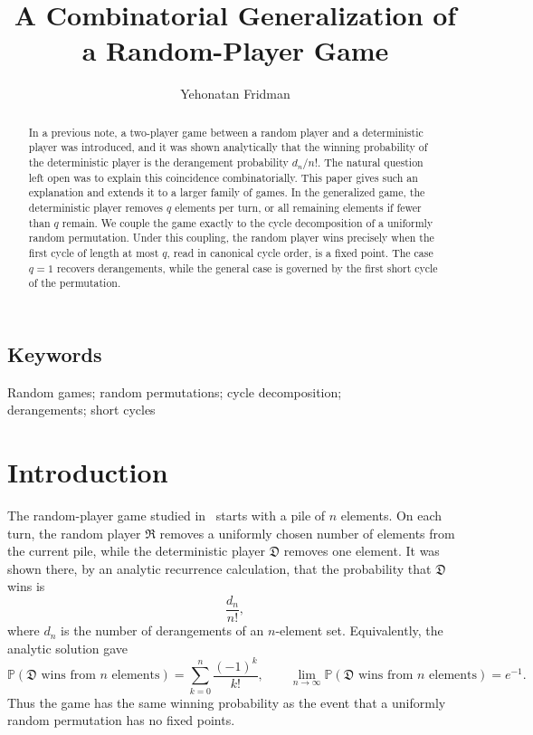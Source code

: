 \documentclass{article}
\title{A Combinatorial Generalization of a Random-Player Game}
\author{Yehonatan Fridman}
\affil{Ben-Gurion University, NRCN, Israel \thanks{fridyeh@post.bgu.ac.il}}
\date{}
\newcommand{\Rplayer}{\mathfrak{R}}
\newcommand{\Dplayer}{\mathfrak{D}}
\begin{document}
\maketitle

\begin{abstract}
In a previous note, a two-player game between a random player and a
deterministic player was introduced, and it was shown analytically that the
winning probability of the deterministic player is the derangement probability
$d_n/n!$. The natural question left open was to explain this coincidence
combinatorially. This paper gives such an explanation and extends it to a
larger family of games. In the generalized game, the deterministic player
removes $q$ elements per turn, or all remaining elements if fewer than $q$
remain. We couple the game exactly to the cycle decomposition of a uniformly
random permutation. Under this coupling, the random player wins precisely when
the first cycle of length at most $q$, read in canonical cycle order, is a
fixed point. The case $q=1$ recovers derangements, while the general case is
governed by the first short cycle of the permutation.
\end{abstract}

\subsection*{Keywords}
Random games; random permutations; cycle decomposition;\\
derangements; short cycles

\section{Introduction}

The random-player game studied in~\cite{fridman2024random} starts with a pile
of $n$ elements. On each turn, the random player $\Rplayer$ removes a uniformly
chosen number of elements from the current pile, while the deterministic player
$\Dplayer$ removes one element. It was shown there, by an analytic recurrence
calculation, that the probability that $\Dplayer$ wins is
\[
    \frac{d_n}{n!},
\]
where $d_n$ is the number of derangements of an $n$-element set. Equivalently,
the analytic solution gave
\[
    \mathbb{P}(\Dplayer\text{ wins from }n\text{ elements})
    =
    \sum_{k=0}^{n}\frac{(-1)^k}{k!},
    \qquad
    \lim_{n\to\infty}
    \mathbb{P}(\Dplayer\text{ wins from }n\text{ elements})
    =e^{-1}.
\]
Thus the game has the same winning probability as the event that a uniformly
random permutation has no fixed points.
\end{document}
